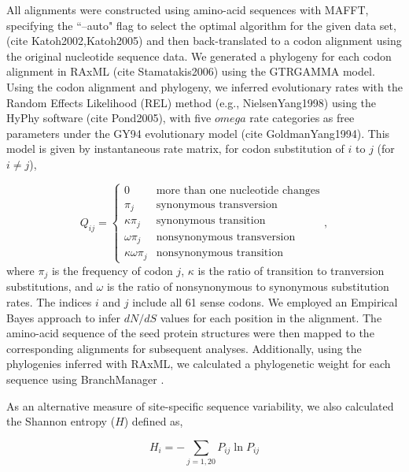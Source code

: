 \documentclass[preprint,12pt]{article}
\begin{document}
        All alignments were constructed using amino-acid sequences with MAFFT, specifying the ``--auto" flag to select the optimal algorithm for the given data set, (cite {Katoh2002,Katoh2005}) and then back-translated to a codon alignment using the original nucleotide sequence data. We generated a phylogeny for each codon alignment in RAxML (cite {Stamatakis2006}) using the GTRGAMMA model. Using the codon alignment and phylogeny, we inferred evolutionary rates with the Random Effects Likelihood (REL) method (e.g., {NielsenYang1998}) using the HyPhy software (cite {Pond2005}), with five $omega$ rate categories as free parameters under the GY94 evolutionary model (cite {GoldmanYang1994}). This model is given by instantaneous rate matrix, for codon substitution of $i$ to $j$ (for $i \neq j$),

        \begin{equation}
            Q_{ij} = \left\{ \begin{array}{rl}
            0                           &\mbox{more than one nucleotide changes} \\
            \pi_j                       &\mbox{synonymous transversion} \\
            \kappa\pi_j              &\mbox{synonymous transition}     \\
            \omega\pi_j              &\mbox{nonsynonymous transversion}  \\
            \kappa\omega\pi_j     &\mbox{nonsynonymous transition}
        \end{array} \right.,
        \end{equation}
        where $\pi_j$ is the frequency of codon $j$, $\kappa$ is the ratio of transition to tranversion substitutions, and $\omega$ is the ratio of nonsynonymous to synonymous substitution rates. The indices $i$ and $j$ include all 61 sense codons. We employed an Empirical Bayes approach \citep{Yang2000} to infer $dN/dS$ values for each position in the alignment. The amino-acid sequence of the seed protein structures were then mapped to the corresponding alignments for subsequent analyses. Additionally, using the phylogenies inferred with RAxML, we calculated a phylogenetic weight for each sequence using BranchManager \citep{Stone2007}.

        As an alternative measure of site-specific sequence variability, we also calculated the Shannon entropy ($H$) defined as,

        \begin{equation}
        H_i = - \sum_{j=1,20}P_{ij}\ln P_{ij}
        \end{equation}
\end{document}
